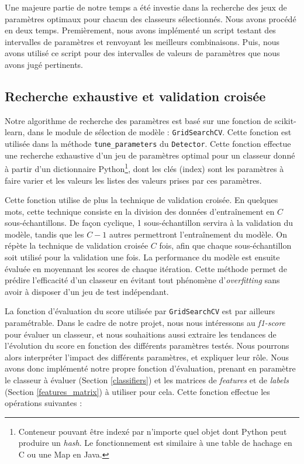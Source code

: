 \documentclass[a4paper]{report}
\begin{document}
Une majeure partie de notre temps a été investie dans la recherche des jeux de paramètres optimaux pour chacun des classeurs sélectionnés. Nous avons procédé en deux temps. Premièrement, nous avons implémenté un script testant des intervalles de paramètres et renvoyant les meilleurs combinaisons. Puis, nous avons utilisé ce script pour des intervalles de valeurs de paramètres que nous avons jugé pertinents.

\subsection{Recherche exhaustive et validation croisée}

Notre algorithme de recherche des paramètres est basé sur une fonction de scikit-learn, dans le module de sélection de modèle : \texttt{GridSearchCV}. Cette fonction est utilisée dans la méthode \texttt{tune\_parameters} du \texttt{Detector}. Cette fonction effectue une recherche exhaustive d'un jeu de paramètres optimal pour un classeur donné à partir d'un dictionnaire Python\footnote{Conteneur pouvant être indexé par n'importe quel objet dont Python peut produire un \emph{hash}. Le fonctionnement est similaire à une table de hachage en C ou une Map en Java.}, dont les clés (index) sont les paramètres à faire varier et les valeurs les listes des valeurs prises par ces paramètres.

Cette fonction utilise de plus la technique de validation croisée. En quelques mots, cette technique consiste en la division des données d'entraînement en $C$ sous-échantillons. De façon cyclique, 1 sous-échantillon servira à la validation du modèle, tandis que les $C-1$ autres permettront l'entraînement du modèle. On répète la technique de validation croisée $C$ fois, afin que chaque sous-échantillon soit utilisé pour la validation une fois. La performance du modèle est ensuite évaluée en moyennant les scores de chaque itération. Cette méthode permet de prédire l'efficacité d'un classeur en évitant tout phénomène d'\emph{overfitting} sans avoir à disposer d'un jeu de test indépendant.

La fonction d'évaluation du score utilisée par \texttt{GridSearchCV} est par ailleurs paramétrable. Dans le cadre de notre projet, nous nous intéressons au \emph{f1-score} pour évaluer un classeur, et nous souhaitions aussi extraire les tendances de l'évolution du score en fonction des différents paramètres testés. Nous pourrons alors interpréter l'impact des différents paramètres, et expliquer leur rôle. Nous avons donc implémenté notre propre fonction d'évaluation, prenant en paramètre le classeur à évaluer (Section \ref{classifiers}) et les matrices de \emph{features} et de \emph{labels} (Section \ref{features_matrix}) à utiliser pour cela. Cette fonction effectue les opérations suivantes :
\end{document}
